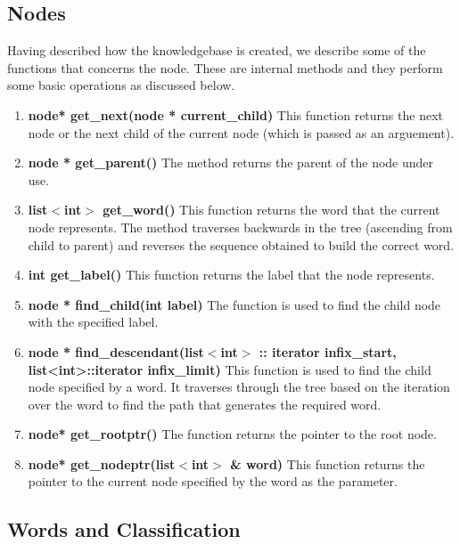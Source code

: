 \subsection{Nodes}
	Having described how the knowledgebase is created, we describe some of the functions that concerns the node. These are internal methods and they perform some basic operations as discussed below.
\begin{enumerate}
\item \textbf{node* get\_next(node * current\_child)} \hfill \vskip 1pt
	This function returns the next node or the next child of the current node (which is passed as an arguement). 
	
\item \textbf{node * get\_parent()} \hfill \vskip 1pt
	The method returns the parent of the node under use.

\item \textbf{list$<$int$>$ get\_word()} \hfill \vskip 1pt
	This function returns the word that the current node represents. The method traverses backwards in the tree (ascending from child to parent) and reverses the sequence obtained to build the correct word.
	
\item \textbf{int get\_label()} \hfill \vskip 1pt
	This function returns the label that the node represents.
	
\item \textbf{node * find\_child(int label)} \hfill \vskip 1pt
	The function is used to find the child node with the specified label.
	
\item \textbf{node * find\_descendant(list$<$int$>$ :: iterator infix\_start, list<int>::iterator infix\_limit)} \hfill \vskip 1pt
	This function is used to find the child node specified by a word. It traverses through the tree based on the iteration over the word to find the path that generates the required word.
	
\item \textbf{node* get\_rootptr()} \hfill \vskip 1pt
	The function returns the pointer to the root node.
	
\item \textbf{node* get\_nodeptr(list$<$int$>$ \& word)} \hfill \vskip 1pt
	This function returns the pointer to the current node specified by the word as the parameter.
	
\end{enumerate}

\subsection{Words and Classification}


